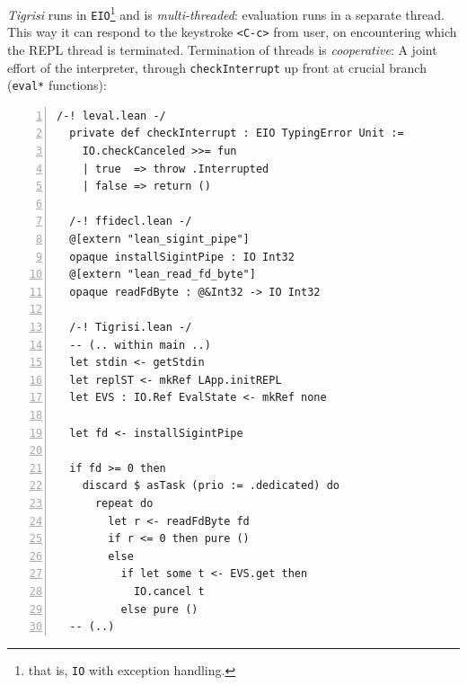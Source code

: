 \documentclass[a4paper, 11pt]{article}
\theoremstyle{remark}\newtheorem*{remark}{Remark}
\theoremstyle{definition}\newtheorem*{definition}{Definition}
\begin{document}
\emph{Tigrisi} runs in \texttt{EIO}\footnote{
that is, \texttt{IO} with exception handling.
}
and is \emph{multi-threaded}: evaluation runs in a separate thread.
This way it can respond to the keystroke \texttt{<C-c>} from user,
on encountering which the REPL thread is terminated. Termination of threads is \emph{cooperative}: A joint effort of the interpreter, through \texttt{checkInterrupt} up front at crucial branch (\texttt{eval*} functions):
\begin{Verbatim}[numbers=left]
  /-! leval.lean -/
  private def checkInterrupt : EIO TypingError Unit :=
    IO.checkCanceled >>= fun
    | true  => throw .Interrupted
    | false => return ()

  /-! ffidecl.lean -/
  @[extern "lean_sigint_pipe"]
  opaque installSigintPipe : IO Int32
  @[extern "lean_read_fd_byte"]
  opaque readFdByte : @&Int32 -> IO Int32

  /-! Tigrisi.lean -/
  -- (.. within main ..)
  let stdin <- getStdin
  let replST <- mkRef LApp.initREPL
  let EVS : IO.Ref EvalState <- mkRef none

  let fd <- installSigintPipe

  if fd >= 0 then
    discard $ asTask (prio := .dedicated) do
      repeat do
        let r <- readFdByte fd
        if r <= 0 then pure ()
        else
          if let some t <- EVS.get then
            IO.cancel t
          else pure ()
  -- (..)
\end{Verbatim}
\end{document}
